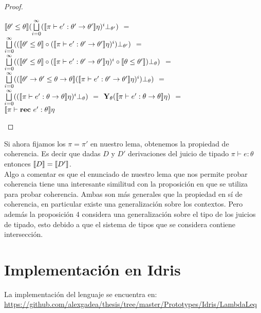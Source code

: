 \begin{proof}
\begin{itemize}
\begin{itemize}
$\llbracket \theta' \leq \theta \rrbracket 
	(\bigsqcup\limits^{\infty}_{i=0} 
	(\llbracket \pi \vdash e' : \theta' \rightarrow \theta' \rrbracket\eta)^{i} \bot_{\theta'})$ $=$\\
$\bigsqcup\limits^{\infty}_{i=0} 
	((\llbracket \theta' \leq \theta \rrbracket \circ
	(\llbracket \pi \vdash e' : \theta' \rightarrow \theta' \rrbracket\eta)^{i}) \bot_{\theta'})$ $=$\\
$\bigsqcup\limits^{\infty}_{i=0} 
	((\llbracket \theta' \leq \theta \rrbracket 
	\circ
	(\llbracket \pi \vdash e' : \theta' \rightarrow \theta' \rrbracket\eta)^{i}
	\circ
	\llbracket \theta \leq \theta' \rrbracket 
	) \bot_{\theta})$ $=$\\
$\bigsqcup\limits^{\infty}_{i=0} 
	((\llbracket \theta' \rightarrow \theta' \leq \theta \rightarrow \theta \rrbracket 
	 (\llbracket \pi \vdash e' : \theta' \rightarrow \theta' \rrbracket\eta)^{i}
	) \bot_{\theta})$ $=$\\
$\bigsqcup\limits^{\infty}_{i=0} (
	(\llbracket \pi \vdash e' : \theta \rightarrow \theta \rrbracket\eta)^{i}
	\bot_{\theta})$ $=$ 
$\textbf{Y}_{\theta} (\llbracket \pi \vdash e' : \theta \rightarrow \theta \rrbracket\eta)$ $=$\\
$\llbracket \pi \vdash \textbf{rec} \ e' : \theta \rrbracket\eta$

\end{itemize}
\end{itemize}
\end{proof}

Si ahora fijamos los $\pi = \pi'$ en nuestro lema, 
obtenemos la propiedad de coherencia. Es decir que dadas $D$ y $D'$ derivaciones 
del juicio de tipado $\pi \vdash e : \theta$ entonces $\llbracket D \rrbracket = \llbracket D' \rrbracket$.\\

Algo a comentar es que el enunciado de nuestro lema que nos permite probar coherencia tiene
una interesante similitud con la proposici\'on en \cite[Prop 4]{coherencereynolds}
que se utiliza para probar coherencia.
Ambas son m\'as generales que la propiedad en s\'i de coherencia, en particular
existe una generalizaci\'on sobre los contextos. Pero adem\'as la proposici\'on 4
considera una generalizaci\'on sobre el tipo de los juicios de tipado, esto debido 
a que el sistema de tipos que se considera contiene intersecci\'on.

\section{Implementaci\'on en Idris}

La implementaci\'on del lenguaje se encuentra en:\\
\url{https://github.com/alexgadea/thesis/tree/master/Prototypes/Idris/LambdaLeq}\\

